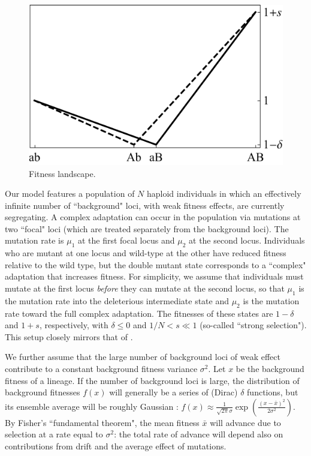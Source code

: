 \documentclass[10pt,twocolumn,twoside]{gsajnl}
\begin{document}
\begin{spacing}{1.5}
\begin{figure}[t]
\begin{center}
  \includegraphics[scale=0.75]{Figures/valley.pdf}
  \caption{Fitness landscape.}
  \label{fig:landscape}
\end{center}
\end{figure}

Our model features a population of $N$ haploid individuals in which an effectively infinite number of ``background" loci, with weak fitness effects, are currently segregating.
A complex adaptation can occur in the population via mutations at two ``focal" loci (which are treated separately from the background loci).
The mutation rate is $\mu_1$ at the first focal locus and $\mu_2$ at the second locus.
Individuals who are mutant at one locus and wild-type at the other have reduced fitness relative to the wild type, but the double mutant state corresponds to a ``complex" adaptation that increases fitness.
For simplicity, we assume that individuals must mutate at the first locus \emph{before} they can mutate at the second locus, so that $\mu_1$ is the mutation rate into the deleterious intermediate state and $\mu_2$ is the mutation rate toward the full complex adaptation.
The fitnesses of these states are $1-\delta$ and $1+s$, respectively, with $\delta \leq 0$ and $1/N < s \ll 1$ (so-called ``strong selection").
This setup closely mirrors that of \citep{weissman_2009}.

We further assume that the large number of background loci of weak effect contribute to a constant background fitness variance $\sigma^2$.
Let $x$ be the background fitness of a lineage.
If the number of background loci is large, the distribution of background fitnesses $f(x)$ will generally be a series of (Dirac) $\delta$ functions, but its ensemble average will be roughly Gaussian \citep{good_2014}: $f(x) \approx \frac{1}{\sqrt{2\pi}\sigma} \exp (\frac{(x-\bar{x})^2}{2\sigma^2})$.
By Fisher's ``fundamental theorem", the mean fitness $\bar{x}$ will advance due to selection at a rate equal to $\sigma^2$: the total rate of advance will depend also on contributions from drift and the average effect of mutations.


\end{spacing}
\end{document}
